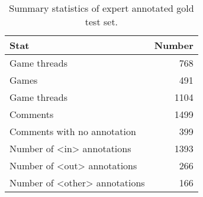 \begin{table}[t]
    \centering
    \begin{tabular}{lr}
        \toprule
        \textbf{Stat} & \textbf{Number} \\\midrule
        Game threads & 768 \\ \midrule
        Games & 491 \\ \midrule
        Game threads & 1104 \\ \midrule
        Comments  & 1499 \\ \midrule
        Comments with no annotation & 399 \\  \midrule
        Number of <in> annotations & 1393 \\\midrule
        Number of <out> annotations & 266 \\\midrule
        Number of <other> annotations & 166 \\\bottomrule
    \end{tabular}
    \caption{Summary statistics of expert annotated gold test set.}
    \label{tab:test-football-stats}
\end{table}
